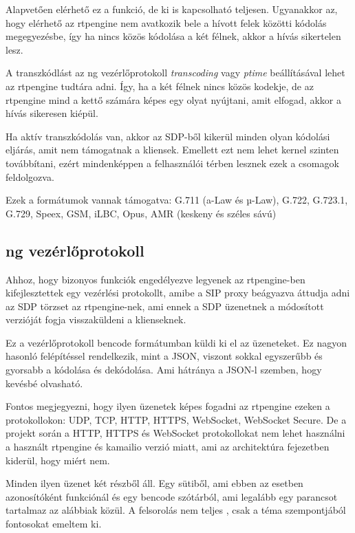 Alapvetően elérhető ez a funkció, de ki is kapcsolható teljesen. Ugyanakkor az, hogy 
elérhető az rtpengine nem avatkozik bele a hívott felek közötti kódolás megegyezésbe, 
így ha nincs közös kódolása a két félnek, akkor a hívás sikertelen lesz.

A transzkódlást az ng vezérlőprotokoll \textit{transcoding} vagy \textit{ptime} beállításával
lehet az rtpengine tudtára adni. Így, ha a két félnek nincs közös kodekje, de az rtpengine
mind a kettő számára képes egy olyat nyújtani, amit elfogad, akkor a hívás sikeresen kiépül.

Ha aktív transzkódolás van, akkor az SDP-ből kikerül minden olyan kódolási eljárás, amit nem támogatnak
a kliensek. Emellett ezt nem lehet kernel szinten továbbítani, ezért mindenképpen a 
felhasználói térben lesznek ezek a csomagok feldolgozva.

Ezek a formátumok vannak támogatva: G.711 (a-Law és µ-Law), G.722, G.723.1, G.729, Speex, 
GSM, iLBC, Opus, AMR (keskeny és széles sávú)

\subsection{ng vezérlőprotokoll}

Ahhoz, hogy bizonyos funkciók engedélyezve legyenek az rtpengine-ben kifejlesztettek 
egy vezérlési protokollt, amibe a SIP proxy beágyazva áttudja adni az SDP törzset 
az rtpengine-nek, ami ennek a SDP üzenetnek a módosított verzióját fogja visszaküldeni
a klienseknek.

Ez a vezérlőprotokoll bencode formátumban küldi ki el az üzeneteket. Ez nagyon hasonló
felépítéssel rendelkezik, mint a JSON, viszont sokkal egyszerűbb és gyorsabb a kódolása 
és dekódolása. Ami hátránya a JSON-l szemben, hogy kevésbé olvasható.

Fontos megjegyezni, hogy ilyen üzenetek képes fogadni az rtpengine ezeken a protokollokon: 
UDP, TCP, HTTP, HTTPS, WebSocket, WebSocket Secure. De a projekt során a HTTP, HTTPS és 
WebSocket protokollokat nem lehet használni a használt rtpengine és kamailio 
verzió miatt, ami az architektúra fejezetben kiderül, hogy miért nem.

Minden ilyen üzenet két részből áll. Egy sütiből, ami ebben az esetben azonosítóként
funkciónál és egy bencode szótárból, ami legalább egy parancsot tartalmaz az 
alábbiak közül. A felsorolás nem teljes \cite{rtpengineng}, csak a téma szempontjából fontosokat 
emeltem ki.

